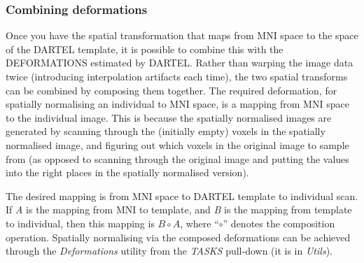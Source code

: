 \subsubsection{Combining deformations}
Once you have the spatial transformation that maps from MNI space to the space of the DARTEL template, it is possible to combine this with the DEFORMATIONS estimated by DARTEL.
Rather than warping the image data twice (introducing interpolation artifacts each time), the two spatial transforms can be combined by composing them together.
The required deformation, for spatially normalising an individual to MNI space, is a mapping from MNI space to the individual image.
This is because the spatially normalised images are generated by scanning through the (initially empty) voxels in the spatially normalised image, and figuring out which voxels in the original image to sample from (as opposed to scanning through the original image and putting the values into the right places in the spatially normalised version).

The desired mapping is from MNI space to DARTEL template to individual scan.
If \emph{A} is the mapping from MNI to template, and \emph{B} is the mapping from template to individual, then this mapping is $B \circ A$, where ``$\circ$'' denotes the composition operation.
Spatially normalising via the composed deformations can be achieved through the \emph{Deformations} utility from the \emph{TASKS} pull-down (it is in \emph{Utils}). 

